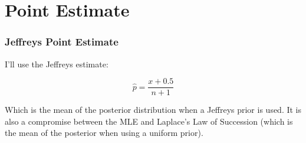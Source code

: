 \documentclass{beamer}\usepackage{knitr}
\begin{document}
\section{Point Estimate}

\begin{frame}
\frametitle{Jeffreys Point Estimate}
I'll use the Jeffreys estimate:

\begin{equation*}
  \hat{p} = \frac{x + 0.5}{n + 1}
\end{equation*}

Which is the mean of the posterior distribution when a Jeffreys prior is used. It is also a compromise between the MLE and Laplace's Law of Succession (which is the mean of the posterior when using a uniform prior).

\end{frame}

% 
% 
\end{document}
